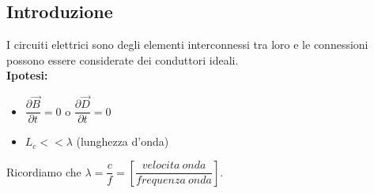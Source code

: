 \documentclass{article}
\begin{document}
\subsection{Introduzione}
I circuiti elettrici sono degli elementi interconnessi tra loro e le connessioni possono essere considerate dei conduttori ideali.
\vspace*{0.2cm}\\
\textbf{Ipotesi:}
\begin{itemize}
    \item $ \dfrac{\partial \vec B}{\partial t} = 0 $ o $ \dfrac{\partial \vec D}{\partial t} = 0 $
    \item $L_c << \lambda$ (lunghezza d'onda)
\end{itemize}
Ricordiamo che $\lambda = \dfrac{c}{f} = \left[ \dfrac{velocita \ onda}{frequenza \ onda} \right]$.
\end{document}

